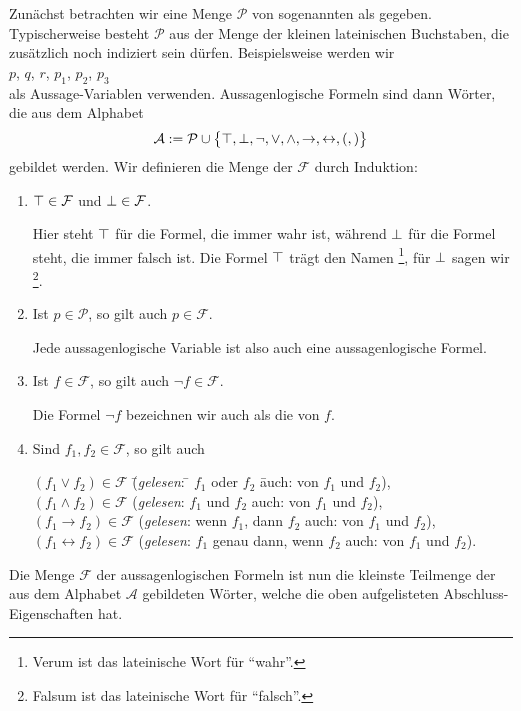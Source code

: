 Zunächst betrachten wir eine Menge $\mathcal{P}$ von sogenannten   als gegeben.
Typischerweise besteht $\mathcal{P}$ aus der Menge der kleinen lateinischen Buchstaben, die
zusätzlich noch indiziert sein dürfen.  Beispielsweise werden wir
\\[0.2cm]
\hspace*{1.3cm}
$p$, $q$, $r$, $p_1$, $p_2$, $p_3$
\\[0.2cm]
als Aussage-Variablen verwenden.
Aussagenlogische Formeln sind dann Wörter, die aus dem Alphabet
$$ 
  \mathcal{A} := \mathcal{P} \cup \bigl\{ \top, \bot, \neg, \vee, \wedge,
   \rightarrow, \leftrightarrow, (, ) \bigr\}
$$
gebildet werden.  Wir definieren die Menge der  $\mathcal{F}$ durch Induktion:
\begin{enumerate}
\item $\top \in \mathcal{F}$ und $\bot \in \mathcal{F}$.

      Hier steht $\top$ für die Formel, die immer wahr ist, während $\bot$ für die 
      Formel steht, die immer falsch ist.  Die Formel $\top$ trägt den Namen
      \footnote{Verum ist das lateinische Wort für ``wahr''.},  für $\bot$ sagen wir  
      \footnote{Falsum ist das lateinische Wort für ``falsch''.}.
\item Ist $p \in \mathcal{P}$, so gilt auch $p \in \mathcal{F}$.

      Jede aussagenlogische Variable ist also auch eine aussagenlogische Formel.
\item Ist $f \in \mathcal{F}$, so gilt auch $\neg f \in \mathcal{F}$.

      Die Formel $\neg f$ bezeichnen wir auch als die  von $f$.
\item Sind $f_1, f_2 \in \mathcal{F}$, so gilt auch
      \begin{tabbing}
        $(f_1 \vee f_2) \in \mathcal{F}$ \hspace*{0.5cm} \= (\textsl{gelesen}: \quad \= $f_1$ oder $f_2$ \hspace*{2.5cm} \=
         auch:  von $f_1$ und $f_2$),            \\
        $(f_1 \wedge f_2) \in \mathcal{F}$                 \> (\textsl{gelesen}:       \> $f_1$ und $f_2$ \>
         auch:  von $f_1$ und $f_2$),            \\
        $(f_1 \rightarrow f_2) \in \mathcal{F}$                \> (\textsl{gelesen}:       \> wenn $f_1$, dann $f_2$ \>
         auch:  von $f_1$ und $f_2$),            \\
        $(f_1 \leftrightarrow f_2) \in \mathcal{F}$                \> (\textsl{gelesen}:       \> $f_1$ genau dann, wenn $f_2$ \>
         auch:  von $f_1$ und $f_2$).            
      \end{tabbing}
\end{enumerate}
Die Menge $\mathcal{F}$ der aussagenlogischen Formeln ist nun die kleinste Teilmenge der aus dem Alphabet $\mathcal{A}$
gebildeten Wörter, welche die oben aufgelisteten Abschluss-Eigenschaften hat.

